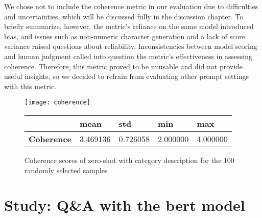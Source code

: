 We chose not to include the coherence metric in our evaluation due to difficulties and uncertainties, which will be discussed fully in the discussion chapter. To briefly summarize, however, the metric's reliance on the same model introduced bias, and issues such as non-numeric character generation and a lack of score variance raised questions about reliability. Inconsistencies between model scoring and human judgment called into question the metric's effectiveness in assessing coherence. Therefore, this metric proved to be unusable and did not provide useful insights, so we decided to refrain from evaluating other prompt settings with this metric. 


\begin{figure}[H]
	\centering
	\texttt{[image: coherence]}
	\begin{tabular}{|l|l|l|l|l|}
		\hline
		\textbf{} & \textbf{mean} & \textbf{std} & \textbf{min} & \textbf{max} \\ \hline
		\textbf{Coherence} & 3.469136  & 0.726058  & 2.000000  & 4.000000 \\ \hline
	\end{tabular}
	\captionsetup{labelformat=andtable}
	\caption{Coherence scores of zero-shot with category description for the 100 randomly selected samples}
	\label{fig:result_coherence}
\end{figure}


\section{Study: Q\&A with the bert model}

